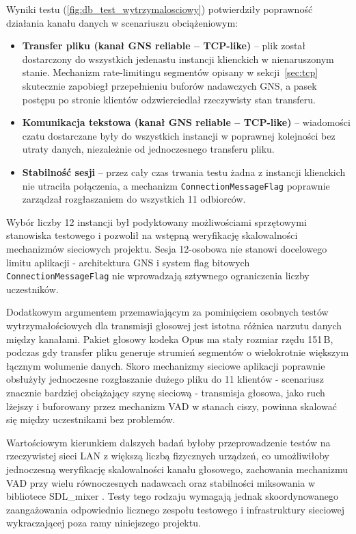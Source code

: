 Wyniki testu (\cref{fig:db_test_wytrzymalosciowy}) potwierdziły poprawność
działania kanału danych w scenariuszu obciążeniowym:

\begin{itemize}
	\item \textbf{Transfer pliku (kanał GNS reliable -- TCP-like)} --
	plik został dostarczony do wszystkich jedenastu instancji
	klienckich w nienaruszonym stanie. Mechanizm rate-limitingu
	segmentów opisany w sekcji~\ref{sec:tcp} skutecznie zapobiegł
	przepełnieniu buforów nadawczych GNS, a pasek postępu
	po stronie klientów odzwierciedlał rzeczywisty stan transferu.
	\item \textbf{Komunikacja tekstowa (kanał GNS reliable -- TCP-like)} --
	wiadomości czatu dostarczane były do wszystkich instancji
	w poprawnej kolejności bez utraty danych, niezależnie od
	jednoczesnego transferu pliku.
	\item \textbf{Stabilność sesji} -- przez cały czas trwania testu
	żadna z instancji klienckich nie utraciła połączenia,
	a mechanizm \texttt{ConnectionMessageFlag} poprawnie zarządzał
	rozgłaszaniem do wszystkich 11 odbiorców.
\end{itemize}

Wybór liczby 12 instancji był podyktowany możliwościami sprzętowymi
stanowiska testowego i pozwolił na wstępną weryfikację skalowalności
mechanizmów sieciowych projektu. Sesja 12-osobowa nie stanowi docelowego
limitu aplikacji - architektura GNS i system flag bitowych
\texttt{ConnectionMessageFlag} nie wprowadzają sztywnego ograniczenia
liczby uczestników.

Dodatkowym argumentem przemawiającym za pominięciem osobnych testów
wytrzymałościowych dla transmisji głosowej jest istotna różnica narzutu
danych między kanałami. Pakiet głosowy kodeka Opus ma stały rozmiar
rzędu 151\,B, podczas gdy transfer pliku generuje strumień segmentów
o wielokrotnie większym łącznym wolumenie danych. Skoro mechanizmy
sieciowe aplikacji poprawnie obsłużyły jednoczesne rozgłaszanie dużego
pliku do 11 klientów - scenariusz znacznie bardziej obciążający szynę
sieciową - transmisja głosowa, jako ruch lżejszy i buforowany przez
mechanizm VAD w stanach ciszy, powinna skalować się między uczestnikami
bez problemów.

Wartościowym kierunkiem dalszych badań byłoby przeprowadzenie testów
na rzeczywistej sieci LAN z większą liczbą fizycznych urządzeń,
co umożliwiłoby jednoczesną weryfikację skalowalności kanału głosowego,
zachowania mechanizmu VAD przy wielu równoczesnych nadawcach oraz
stabilności miksowania w bibliotece SDL\_mixer \cite{SDLMixer}.
Testy tego rodzaju wymagają jednak skoordynowanego zaangażowania
odpowiednio licznego zespołu testowego i infrastruktury sieciowej
wykraczającej poza ramy niniejszego projektu.
